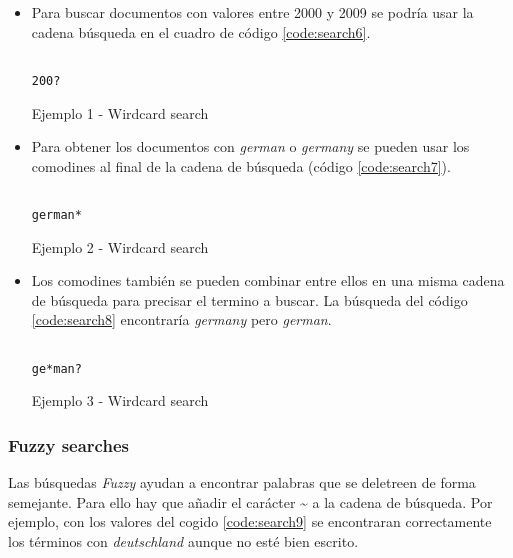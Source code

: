 \begin{itemize}
	\item Para buscar documentos con valores entre 2000 y 2009 se podría usar la cadena búsqueda en el cuadro de código \ref{code:search6}.
\begin{listing}[H]
\begin{verbatim}
	
200?
\end{verbatim}
	\caption{Ejemplo 1 - Wirdcard search}
	\label{code:search6}
\end{listing}
	\item Para obtener los documentos con \textit{german} o \textit{germany} se pueden usar los comodines al final de la cadena de búsqueda (código \ref{code:search7}). 
    \begin{listing}[H]
\begin{verbatim}
	
german*
\end{verbatim}
	\caption{Ejemplo 2 - Wirdcard search}
	\label{code:search7}
\end{listing}

	\item Los comodines también se pueden combinar entre ellos en una misma cadena de búsqueda para precisar el termino a buscar. La búsqueda del código \ref{code:search8} encontraría \textit{germany} pero \textit{german}.
\begin{listing}[H]
\begin{verbatim}
	
ge*man?
\end{verbatim}
	\caption{Ejemplo 3 - Wirdcard search}
	\label{code:search8}
\end{listing}
\end{itemize}


\subsubsection{Fuzzy searches}
Las búsquedas \textit{Fuzzy} ayudan  a encontrar palabras que se deletreen de forma semejante. Para ello hay que añadir el carácter \~{} a la cadena de búsqueda. Por ejemplo, con los valores del cogido \ref{code:search9} se encontraran correctamente los términos con \textit{deutschland} aunque no esté bien escrito.

